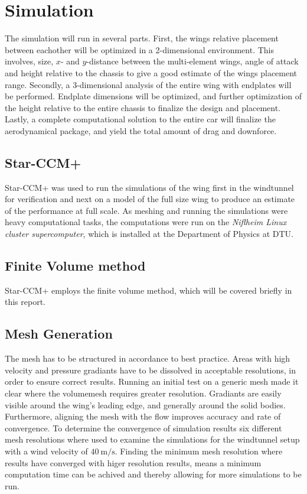 \chapter{Simulation}
\label{chap:simulations}

  The simulation will run in several parts. First, the wings relative placement between eachother will be optimized in a 2-dimensional environment. This involves, size, $x$- and $y$-distance between the multi-element wings, angle of attack and height relative to the chassis to give a good estimate of the wings placement range. Secondly, a 3-dimensional analysis of the entire wing with endplates will be performed. Endplate dimensions will be optimized, and further optimization of the height relative to the entire chassis to finalize the design and placement. Lastly, a complete computational solution to the entire car will finalize the aerodynamical package, and yield the total amount of drag and downforce.

\section{Star-CCM+}
  Star-CCM+ was used to run the simulations of the wing first in the windtunnel for
  verification and next on a model of the full size wing
  to produce an estimate of the performance at full scale.
  As meshing and running the simulations were heavy computational tasks, the computations were
  run on the \emph{Niflheim Linux cluster supercomputer}, which is installed at
  the Department of Physics at DTU.




\section{Finite Volume method}

  Star-CCM+ employs the finite volume method, which will be covered briefly in this report.

\section{Mesh Generation}
  The mesh has to be structured in accordance to best practice. Areas with high velocity and pressure gradiants have to be dissolved in acceptable resolutions, in order to ensure correct results. Running an initial test on a generic mesh made it clear where the volumemesh requires greater resolution. Gradiants are easily visible around the wing's leading edge, and generally around the solid bodies. Furthermore, aligning the mesh with the flow improves accuracy and rate of convergence. To determine the convergence of simulation results six different mesh resolutions where used to examine the simulations for the windtunnel setup with a wind velocity of $\SI{40}{\metre\per\second}$. Finding the minimum mesh resolution where results have converged with higer resolution results, means a minimum computation time can be achived and thereby allowing for more simulations to be run.

